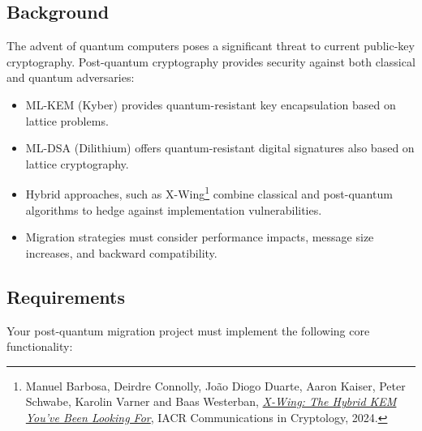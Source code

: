 \documentclass[10pt,a4paper,american]{exam}
\begin{document}
\subsection*{Background}
The advent of quantum computers poses a significant threat to current public-key cryptography. Post-quantum cryptography provides security against both classical and quantum adversaries:
\begin{itemize}
	\item ML-KEM (Kyber) provides quantum-resistant key encapsulation based on lattice problems.
	\item ML-DSA (Dilithium) offers quantum-resistant digital signatures also based on lattice cryptography.
	\item Hybrid approaches, such as X-Wing\footnote{Manuel Barbosa, Deirdre Connolly, Jo\~ao Diogo Duarte, Aaron Kaiser, Peter Schwabe, Karolin Varner and Baas Westerban, \href{https://appliedcryptography.page/paper/\#xwing-hybrid}{\textit{X-Wing: The Hybrid KEM You've Been Looking For}}, IACR Communications in Cryptology, 2024.} combine classical and post-quantum algorithms to hedge against implementation vulnerabilities.
	\item Migration strategies must consider performance impacts, message size increases, and backward compatibility.
\end{itemize}

\subsection*{Requirements}
Your post-quantum migration project must implement the following core functionality:
\end{document}
